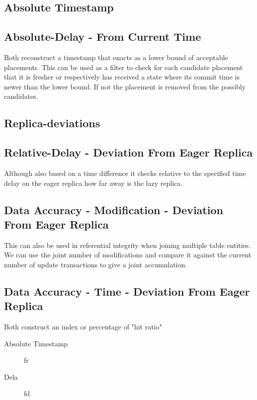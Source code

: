 \subsection{Absolute Timestamp}
\subsection{Absolute-Delay - From Current Time}
Both reconstruct a timestamp that enacts as a lower bound of acceptable placements.
This can be used as a filter to check for each candidate placement that it is fresher or respectively has received a state where its commit time is newer 
than the lower bound. If not the placement is removed from the possibly candidates. 


\tocless\subsection{Replica-deviations}

\subsection{Relative-Delay - Deviation From Eager Replica}
Although also based on a time difference it checks relative to the specified time delay on the eager  replica how far away is the lazy replica.

\subsection{Data Accuracy - Modification - Deviation From Eager Replica}
This can also be used in referential integrity when joining multiple table entities.
We can use the joint number of modifications and compare it against the current number of update transactions to give a joint accumulation.


\subsection{Data Accuracy - Time -  Deviation From Eager Replica}

Both construct an index or percentage of "hit ratio"


\begin{description}
    \item [Absolute Timestamp]  fr
    \item [Dela] fd
\end{description}


